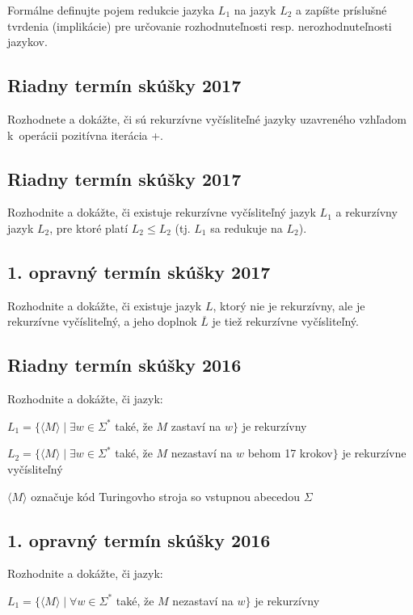 \documentclass[11pt,a4paper]{article}
\begin{document}
		Formálne definujte pojem redukcie jazyka $L_1$ na jazyk $L_2$ a zapíšte príslušné tvrdenia (implikácie) pre určovanie rozhodnuteľnosti resp. nerozhodnuteľnosti jazykov.

		\subsection{Riadny termín skúšky 2017}

		Rozhodnete a dokážte, či sú rekurzívne vyčísliteľné jazyky uzavreného vzhľadom k~operácii pozitívna iterácia +.

		\subsection{Riadny termín skúšky 2017}

		Rozhodnite a dokážte, či existuje rekurzívne vyčísliteľný jazyk $L_1$ a rekurzívny jazyk $L_2$, pre ktoré platí $L_2 \leq L_2$ (tj. $L_1$ sa redukuje na $L_2$).

		\subsection{1. opravný termín skúšky 2017}

		Rozhodnite a dokážte, či existuje jazyk $L$, ktorý nie je rekurzívny, ale je rekurzívne vyčísliteľný, a jeho doplnok $\overline{L}$ je tiež rekurzívne vyčísliteľný.

		\subsection{Riadny termín skúšky 2016}

		Rozhodnite a dokážte, či jazyk:

		$L_1 = \{\langle M \rangle \mid \exists w \in \Sigma^*$ také, že $M$ zastaví na $w\}$ je rekurzívny

		$L_2 = \{\langle M \rangle \mid \exists w \in \Sigma^*$ také, že $M$ nezastaví na $w$ behom 17 krokov$\}$ je rekurzívne vyčísliteľný

		$\langle M \rangle$ označuje kód Turingovho stroja so vstupnou abecedou $\Sigma$

		\subsection{1. opravný termín skúšky 2016}

		Rozhodnite a dokážte, či jazyk:

		$L_1 = \{\langle M \rangle \mid \forall w \in \Sigma^*$ také, že $M$ nezastaví na $w\}$ je rekurzívny
\end{document}
